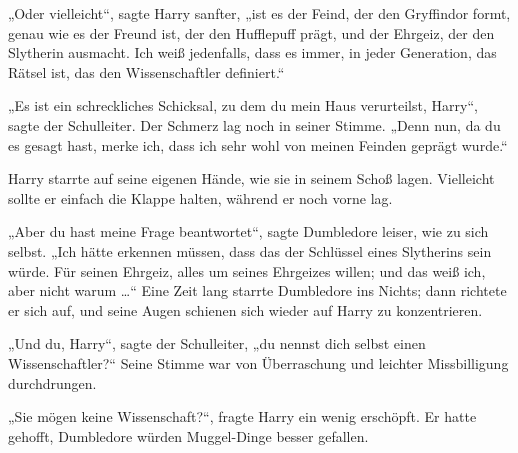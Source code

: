 „Oder vielleicht“, sagte Harry sanfter, „ist es der Feind, der den Gryffindor formt, genau wie es der Freund ist, der den Hufflepuff prägt, und der Ehrgeiz, der den Slytherin ausmacht. Ich weiß jedenfalls, dass es immer, in jeder Generation, das Rätsel ist, das den Wissenschaftler definiert.“

„Es ist ein schreckliches Schicksal, zu dem du mein Haus verurteilst, Harry“, sagte der Schulleiter. Der Schmerz lag noch in seiner Stimme.
„Denn nun, da du es gesagt hast, merke ich, dass ich sehr wohl von meinen Feinden geprägt wurde.“

Harry starrte auf seine eigenen Hände, wie sie in seinem Schoß lagen. Vielleicht sollte er einfach die Klappe halten, während er noch vorne lag.

„Aber du hast meine Frage beantwortet“, sagte Dumbledore leiser, wie zu sich selbst.
„Ich hätte erkennen müssen, dass das der Schlüssel eines Slytherins sein würde. Für seinen Ehrgeiz, alles um seines Ehrgeizes willen; und das weiß ich, aber nicht warum …“ Eine Zeit lang starrte Dumbledore ins Nichts; dann richtete er sich auf, und seine Augen schienen sich wieder auf Harry zu konzentrieren.

„Und du, Harry“, sagte der Schulleiter, „du nennst dich selbst einen Wissenschaftler?“ Seine Stimme war von Überraschung und leichter Missbilligung durchdrungen.

„Sie mögen keine Wissenschaft?“, fragte Harry ein wenig erschöpft. Er hatte gehofft, Dumbledore würden Muggel-Dinge besser gefallen.

